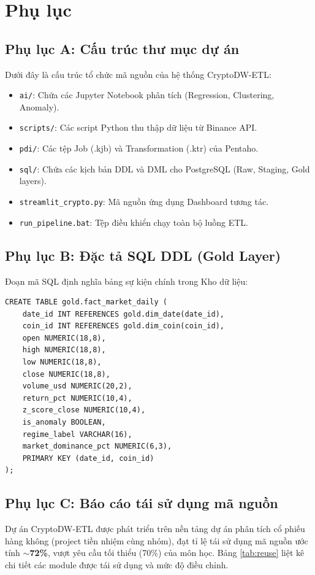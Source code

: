 \section*{Phụ lục}

\subsection*{Phụ lục A: Cấu trúc thư mục dự án}
Dưới đây là cấu trúc tổ chức mã nguồn của hệ thống CryptoDW-ETL:
\begin{itemize}
    \item \texttt{ai/}: Chứa các Jupyter Notebook phân tích (Regression, Clustering, Anomaly).
    \item \texttt{scripts/}: Các script Python thu thập dữ liệu từ Binance API.
    \item \texttt{pdi/}: Các tệp Job (.kjb) và Transformation (.ktr) của Pentaho.
    \item \texttt{sql/}: Chứa các kịch bản DDL và DML cho PostgreSQL (Raw, Staging, Gold layers).
    \item \texttt{streamlit\_crypto.py}: Mã nguồn ứng dụng Dashboard tương tác.
    \item \texttt{run\_pipeline.bat}: Tệp điều khiển chạy toàn bộ luồng ETL.
\end{itemize}

\subsection*{Phụ lục B: Đặc tả SQL DDL (Gold Layer)}
Đoạn mã SQL định nghĩa bảng sự kiện chính trong Kho dữ liệu:
\begin{verbatim}
CREATE TABLE gold.fact_market_daily (
    date_id INT REFERENCES gold.dim_date(date_id),
    coin_id INT REFERENCES gold.dim_coin(coin_id),
    open NUMERIC(18,8),
    high NUMERIC(18,8),
    low NUMERIC(18,8),
    close NUMERIC(18,8),
    volume_usd NUMERIC(20,2),
    return_pct NUMERIC(10,4),
    z_score_close NUMERIC(10,4),
    is_anomaly BOOLEAN,
    regime_label VARCHAR(16),
    market_dominance_pct NUMERIC(6,3),
    PRIMARY KEY (date_id, coin_id)
);
\end{verbatim}

\subsection*{Phụ lục C: Báo cáo tái sử dụng mã nguồn}

Dự án CryptoDW-ETL được phát triển trên nền tảng dự án phân tích cổ phiếu hàng không (project tiền nhiệm cùng nhóm), đạt tỉ lệ tái sử dụng mã nguồn ước tính \textbf{$\sim$72\%}, vượt yêu cầu tối thiểu (70\%) của môn học. Bảng \ref{tab:reuse} liệt kê chi tiết các module được tái sử dụng và mức độ điều chỉnh.

